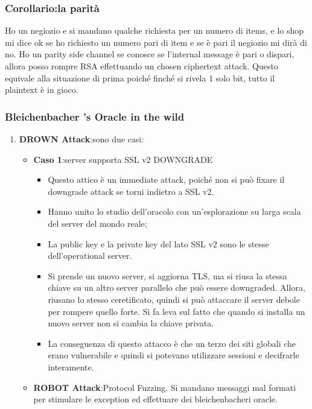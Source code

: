 \documentclass{book}
\theoremstyle{remark}
\begin{document}
\subsubsection{Corollario:\@Attaccando la parità}
Ho un negiozio e si mandano qualche richiesta per un numero di items, e lo shop mi dice ok se ho richiesto un numero pari di item e se è pari il negiozio mi dirà di no\@.\newline
Ho un parity side channel se conosce se l'internal message è pari o dispari, allora posso rompre RSA effettuando un chosen ciphertext attack\@. Questo equivale alla situazione di prima poiché finché si rivela 1 solo bit, tutto il plaintext è in gioco\@.
\subsubsection{Bleichenbacher 's Oracle in the wild}
\begin{enumerate}
	\item \textbf{DROWN Attack}:\@Ci sono due casi:\begin{itemize}
		\item \textbf{Caso 1}:\@Il server supporta SSL v2 DOWNGRADE\begin{itemize}
			\item Questo attico è un immediate attack, poiché non si può fixare il downgrade attack se torni indietro a SSL v2\@.
			\item Hanno unito lo studio dell'oracolo con un'esplorazione su larga scala del server del mondo reale;\@
			\item La public key e la private key del lato SSL v2 sono le stesse dell'operational server\@.
			\item Si prende un nuovo server, si aggiorna TLS, ma si riusa la stessa chiave su un altro server parallelo che può essere downgraded\@. Allora, riusano lo stesso ceretificato, quindi si può attaccare il server debole per rompere quello forte\@. Si fa leva sul fatto che quando si installa un nuovo server non si cambia la chiave privata\@.
			\item La conseguenza di questo attacco è che un terzo dei siti globali che erano vulnerabile e quindi si potevano utilizzare sessioni e decifrarle interamente\@.
		\end{itemize}
		\item \textbf{ROBOT Attack}:Protocol Fuzzing\@. Si mandano messaggi mal formati per stimulare le exception ed effettuare dei bleichenbacheri oracle\@.
	\end{itemize}
\end{enumerate}
\end{document}
